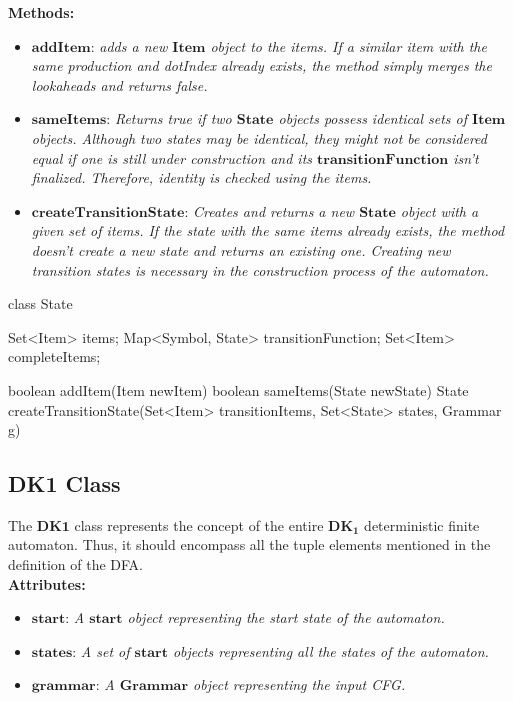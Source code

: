 \textbf{Methods:}
\begin{itemize}
    \item \(\boldsymbol{addItem}\): \textit{adds a new \(\boldsymbol{Item}\) object to the items. If a similar item with the same production and dotIndex already exists, the method simply merges the lookaheads and returns false.}
    \item \(\boldsymbol{sameItems}\): \textit{Returns true if two \(\boldsymbol{State}\) objects possess identical sets of \(\boldsymbol{Item}\) objects. Although two states may be identical, they might not be considered equal if one is still under construction and its \(\boldsymbol{transitionFunction}\) isn’t finalized. Therefore, identity is checked using the items.}
    \item \(\boldsymbol{createTransitionState}\): \textit{Creates and returns a new \(\boldsymbol{State}\) object with a given set of items. If the state with the same items already exists, the method doesn’t create a new state and returns an existing one. Creating new transition states is necessary in the construction process of the automaton.}
\end{itemize}

\begin{codeblock}
    class State {
        Set<Item> items;
        Map<Symbol, State> transitionFunction;
        Set<Item> completeItems;

        boolean addItem(Item newItem) {}
        boolean sameItems(State newState) {}
        State createTransitionState(Set<Item> transitionItems, Set<State> states, Grammar g) {}
    }
\end{codeblock}

\vspace{10pt}

\subsection{DK1 Class}

The \(\boldsymbol{DK1}\) class represents the concept of the entire \(\boldsymbol{DK_{1}}\) deterministic finite automaton. Thus, it should encompass all the tuple elements mentioned in the definition of the DFA.\\

\textbf{Attributes:}
\begin{itemize}
    \item \(\boldsymbol{start}\): \textit{A \(\boldsymbol{start}\) object representing the start state of the automaton.}
    \item \(\boldsymbol{states}\): \textit{A set of \(\boldsymbol{start}\) objects representing all the states of the automaton.}
    \item \(\boldsymbol{grammar}\): \textit{A \(\boldsymbol{Grammar}\) object representing the input CFG.}
\end{itemize}

